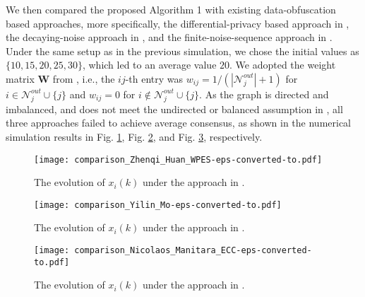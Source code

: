 \documentclass{IEEEtran}
\begin{document}
%

We then compared the proposed Algorithm 1 with existing data-obfuscation based approaches, more specifically, the differential-privacy based approach in \cite{huang2012differentially}, the decaying-noise approach in \cite{mo2017privacy}, and the finite-noise-sequence approach in \cite{manitara2013privacy}. Under the same setup as in the previous simulation, we chose the initial values as $\{10, 15, 20, 25, 30\}$, which led to an average value $20$. We adopted the weight matrix $\mathbf{W}$ from \cite{huang2012differentially}, i.e., the $ij$-th entry was $w_{ij}={1}/{(|\mathcal{N}_j^{out}|+1)}$ for $i\in \mathcal{N}_j^{out} \cup \{j\}$ and $w_{ij} = 0$ for $i\notin \mathcal{N}_j^{out}\cup \{j\}$. As the graph is directed and imbalanced, and does not meet the undirected or balanced assumption in \cite{huang2012differentially, manitara2013privacy, mo2017privacy}, all three approaches failed to achieve average consensus, as shown in the numerical simulation results in Fig. \ref{comparison_Zhenqi_Huan_WPES}, Fig. \ref{comparison_Yilin_Mo}, and Fig. \ref{comparison_Nicolaos_Manitara_ECC}, respectively.
\begin{figure}[!h]
	\begin{center}
		\texttt{[image: comparison\_Zhenqi\_Huan\_WPES-eps-converted-to.pdf]}
	\end{center}
	\caption{The evolution of $x_i(k)$ under the approach in \cite{huang2012differentially}.}
	\label{comparison_Zhenqi_Huan_WPES}
\end{figure} 
\begin{figure}[!h]
	\begin{center}
		\texttt{[image: comparison\_Yilin\_Mo-eps-converted-to.pdf]}
	\end{center}
	\caption{The evolution of $x_i(k)$ under the approach in \cite{mo2017privacy}.}
	\label{comparison_Yilin_Mo}
\end{figure} 
\begin{figure}[!h]
	\begin{center}
		\texttt{[image: comparison\_Nicolaos\_Manitara\_ECC-eps-converted-to.pdf]}
	\end{center}
	\caption{The evolution of $x_i(k)$ under the approach in \cite{manitara2013privacy}.}
	\label{comparison_Nicolaos_Manitara_ECC}
\end{figure}
\end{document}
